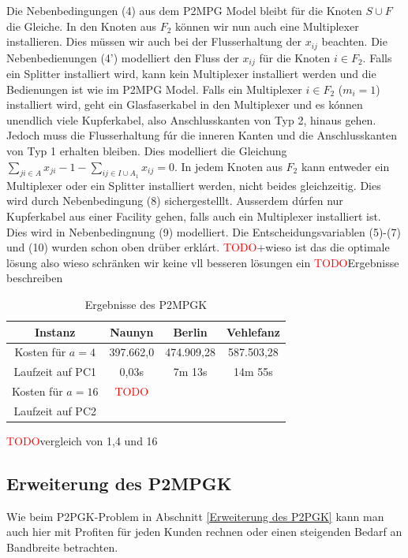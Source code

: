\documentclass[11pt,a4paper]{article}
\newcommand{\TODO}{\textcolor{red}{TODO}}
\theoremstyle{my_th_style1}
\begin{document}
  Die Nebenbedingungen (4) aus dem P2MPG Model bleibt für die Knoten $S \cup F$ die Gleiche. In den Knoten aus $F_2$ können wir nun auch eine Multiplexer installieren. Dies müssen wir auch bei der Flusserhaltung der $x_{ij}$ beachten. Die Nebenbedienungen (4') modelliert den Fluss der $x_{ij}$ für die Knoten $i \in F_2$. Falls ein Splitter installiert wird, kann kein Multiplexer installiert werden und die Bedienungen ist wie im P2MPG Model. Falls ein Multiplexer $i \in F_2$ ($m_i=1$) installiert wird, geht ein Glasfaserkabel in den Multiplexer und es k\'onnen unendlich viele Kupferkabel, also Anschlusskanten von Typ 2, hinaus gehen. Jedoch muss die Flusserhaltung f\'ur die inneren Kanten und die Anschlusskanten von Typ 1 erhalten bleiben. Dies modelliert die Gleichung $\displaystyle\sum_{ji \in A} x_{ji} -1 - \displaystyle\sum_{ij \in I \cup A_1} x_{ij}=0$.  In jedem Knoten aus $F_2$ kann entweder ein Multiplexer oder ein Splitter installiert werden, nicht beides gleichzeitig. Dies wird durch Nebenbedingung (8) sichergestelllt. Ausserdem d\'urfen nur Kupferkabel aus einer Facility gehen, falls auch ein Multiplexer installiert ist. Dies wird in Nebenbedingnung (9) modelliert. Die Entscheidungsvariablen (5)-(7) und (10)
wurden schon oben dr\"uber erkl\'art.   
   \TODO+wieso ist das die optimale lösung also wieso schränken wir keine vll besseren lösungen ein
   \TODO Ergebnisse beschreiben
 \begin{table}[h]
	\centering
	\begin{tabular}{c|c|c|c}
		Instanz & Naunyn & Berlin & Vehlefanz \\	
		\hline
		Kosten für $a=4$ & 397.662,0 & 474.909,28 & 587.503,28 \\
		Laufzeit auf PC1 & 0,03s & 7m 13s & 14m 55s \\
		\hline
		Kosten für $a=16$ & \TODO &  &  \\
		Laufzeit auf PC2 &  &  & \\
	\end{tabular}
	\label{P2MPGK}
	\caption{Ergebnisse des P2MPGK} 
\end{table}
\TODO vergleich von 1,4 und 16 
   
 \subsection{Erweiterung des P2MPGK}
 Wie beim P2PGK-Problem in Abschnitt \ref{Erweiterung des P2PGK} kann man auch hier mit Profiten f\"ur jeden Kunden rechnen oder einen steigenden Bedarf an Bandbreite betrachten.
 
\end{document}
